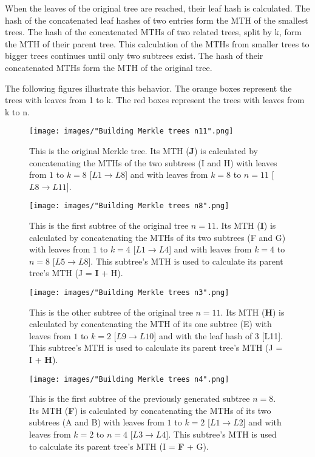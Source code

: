 \documentclass{article}
\begin{document}
		When the leaves of the original tree are reached, their leaf hash is calculated. The hash of the concatenated leaf hashes of two entries form the MTH of the smallest trees. The hash of the concatenated MTHs of two related trees, split by k, form the MTH of their parent tree. This calculation of the MTHs from smaller trees to bigger trees continues until only two subtrees exist. The hash of their concatenated MTHs form the MTH of the original tree.

		The following figures illustrate this behavior. The orange boxes represent the trees with leaves from 1 to k. The red boxes represent the trees with leaves from k to n.
		
		\begin{figure}[H]
			\centering
			\caption{This is the original Merkle tree. Its MTH (\textbf{J}) is calculated by concatenating the MTHs of the two subtrees (I and H) with leaves from $ 1 $ to $ k=8 $ [$ L1 \rightarrow L8 $] and with leaves from $ k=8 $ to $ n=11 $ [$ L8 \rightarrow L11 $].}
			\texttt{[image: images/"Building Merkle trees n11".png]}
		\end{figure}
		
		\begin{figure}[H]
			\centering
			\caption{This is the first subtree of the original tree $ n=11 $. Its MTH (\textbf{I}) is calculated by concatenating the MTHs of its two subtrees (F and G) with leaves from $ 1 $ to $ k=4 $ [$ L1 \rightarrow L4 $] and with leaves from $ k=4 $ to $ n=8 $ [$ L5 \rightarrow L8 $].  This subtree's MTH is used to calculate its parent tree's MTH (J = \textbf{I} + H).}
			\texttt{[image: images/"Building Merkle trees n8".png]}
		\end{figure}
	

		\begin{figure}[H]
			\centering
			\caption{This is the other subtree of the original tree $ n=11 $. Its MTH (\textbf{H}) is calculated by concatenating the MTH of its one subtree (E) with leaves from $ 1 $ to $ k=2 $ [$ L9 \rightarrow L10 $] and with the leaf hash of 3 [L11]. This subtree's MTH is used to calculate its parent tree's MTH (J = I + \textbf{H}).}
			\texttt{[image: images/"Building Merkle trees n3".png]}
		\end{figure}
		
		\begin{figure}[H]
			\centering
			\caption{This is the first subtree of the previously generated subtree $ n=8 $. Its MTH (\textbf{F}) is calculated by concatenating the MTHs of its two subtrees (A and B) with leaves from $ 1 $ to $ k=2 $ [$ L1 \rightarrow L2 $] and with leaves from $ k=2 $ to $ n=4 $ [$ L3 \rightarrow L4 $]. This subtree's MTH is used to calculate its parent tree's MTH (I = \textbf{F} + G).}
			\texttt{[image: images/"Building Merkle trees n4".png]}
		\end{figure}
	
\end{document}

